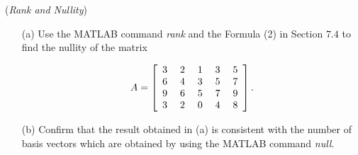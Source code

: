 \begin{exer}
(\textit{Rank and Nullity})

\begin{enumerate}

\item[(a)] Use the MATLAB command \textit{rank} and the Formula (2) in Section $7.4$ to find the nullity of the matrix

\begin{displaymath}
A = \left[\begin{array}{rrrrr} 3& \hspace{1mm} 2& \hspace{1mm} 1&\hspace{1mm} 3&\hspace{1mm} 5\\ 6 & 4 & 3 & 5 & 7 \\ 9 & 6 & 5 & 7 & 9 \\ 3 & 2 & 0 & 4 & 8 \end{array} \right].
\end{displaymath}


\item[(b)] Confirm that the result obtained in (a) is consistent with the number of basis vectors which are obtained by using the MATLAB command \textit{null}.

\end{enumerate}

\end{exer}


